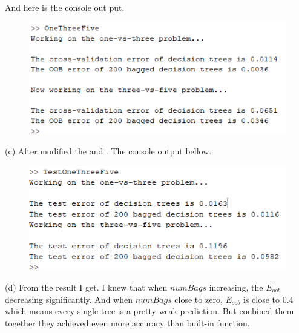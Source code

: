 \documentclass{article}
\begin{document}
\begin{tlist}{4}
    And here is the console out put.
    \begin{figure}[H]\centering\includegraphics[width=\textwidth]{(a)output.png}\end{figure}
  \item[(c)] After modified the  and . The console   output bellow.
    \begin{figure}[H]\centering\includegraphics[width=\textwidth]{(c)output.png}\end{figure}
  \item[(d)] From the result I get. I knew that when $numBags$ increasing, the $E_{oob}$ decreasing significantly. And when $numBags$ close to zero, $E_{oob}$ is close to $0.4$ which means every single tree is a pretty weak prediction. But conbined them together they achieved even more accuracy than built-in function.
\end{tlist}
\section{}
\end{document}
